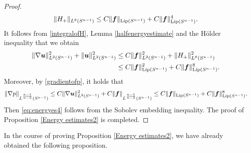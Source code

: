 \documentclass[12pt]{amsart}
\newcommand{\Bu}{{\boldsymbol{u}}}
\newcommand{\Bf}{{\boldsymbol{f}}}
\begin{document}
{\begin{proof}
		\begin{equation}\label{integralofH}
			\|H_{+}\|_{L^\theta(S^{n-1})} \leq C \|\Bf\|_{\textnormal{Lip}(S^{n-1})} + C \|\Bf\|_{\textnormal{Lip}(S^{n-1})}^{4}. 
		\end{equation}
		It follows from \eqref{integralofH}, Lemma \ref{halfenergyestimate} and the H\"older inequality that we obtain
		\begin{equation}\label{energyestimatefinal}
			\begin{aligned}
				\|\nabla \Bu\|_{L^2(S^{n-1})}^2 + \|\Bu\|_{L^2(S^{n-1})}^2 
				&\leq C \|\Bf\|_{L^2(S^{n-1})}^2 + \|H_{+}\|_{L^\theta(S^{n-1})}^2 \\
				& \leq C \|\Bf\|_{\textnormal{Lip}(S^{n-1})}^2 + C \|\Bf\|_{\textnormal{Lip}(S^{n-1})}^{8}.
			\end{aligned}
		\end{equation}
		Moreover, by \eqref{gradientofp}, it holds that
		\begin{equation*}
			\begin{aligned}
				\|\nabla p\|_{L^{\frac{n-1}{n-2}}(S^{n-1})} 
				\leq C \| \nabla \Bu\|_{L^{2}(S^{n-1})}^2+ C \| \Bf\|_{L^{\frac{n-1}{n-2}}(S^{n-1})} \leq C \|\Bf\|_{\textnormal{Lip}(S^{n-1})} + C\|\Bf\|_{\textnormal{Lip}(S^{n-1})}^{8}.            
			\end{aligned}
		\end{equation*}
		Then \eqref{eq:energyes4} follows from the Sobolev embedding inequality. The proof of Proposition \ref{Energy estimates2} is completed.
	\end{proof}
	
	
	
}


In the course of proving Proposition \ref{Energy estimates2}, we have already obtained the following proposition.
\end{document}
